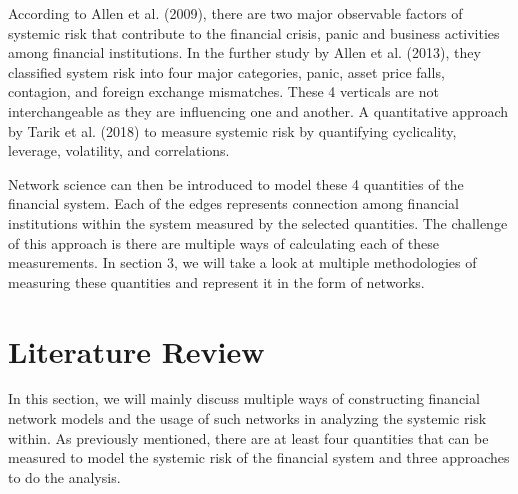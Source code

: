 \documentclass[a4paper,11pt]{article}
\begin{document}
According to Allen et al. (2009), there are two major observable factors of systemic risk that contribute to the financial crisis, panic and business activities among financial institutions. In the further study by Allen et al. (2013), they classified system risk into four major categories, panic, asset price falls, contagion, and foreign exchange mismatches. These 4 verticals are not interchangeable as they are influencing one and another. A quantitative approach by Tarik et al. (2018) to measure systemic risk by quantifying cyclicality, leverage, volatility, and correlations. 

Network science can then be introduced to model these 4 quantities of the financial system. Each of the edges represents connection among financial institutions within the system measured by the selected quantities. The challenge of this approach is there are multiple ways of calculating each of these measurements. In section 3, we will take a look at multiple methodologies of measuring these quantities and represent it in the form of networks.

\section{Literature Review}
In this section, we will mainly discuss multiple ways of constructing financial network models and the usage of such networks in analyzing the systemic risk within. As previously mentioned, there are at least four quantities that can be measured to model the systemic risk of the financial system and three approaches to do the analysis.
\end{document}
